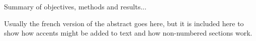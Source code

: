 \documentclass[11pt]{book}\usepackage[]{graphicx}\usepackage[]{color}
\newcommand{\latex}{\LaTeX\xspace}
\begin{document}
\def \KnitrHomePath {C:\GitHub\latex-knitr\doc}  %



\setcounter{secnumdepth}{5} %

\renewcommand{\thesection}{\arabic{section}}
\renewcommand{\thetable}{\arabic{table}}
\renewcommand{\thefigure}{\arabic{figure}}
\renewcommand{\theequation}{\arabic{equation}}




Summary of objectives, methods and results...

\newpage


Usually the french version of the abstract goes here, but it is included here to show how accents might be added to text and how non-numbered sections work.

\clearpage

\setcounter{page}{1}
\end{document}
